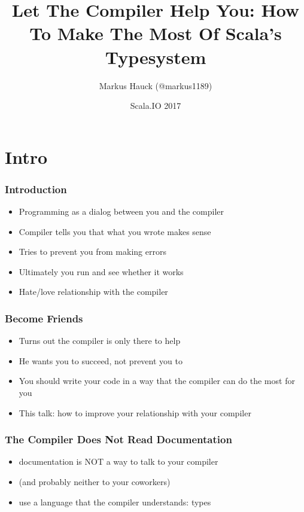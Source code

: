 \documentclass{beamer}
\title{Let The Compiler Help You: How To Make The Most Of Scala's Typesystem}
\author{Markus Hauck (@markus1189)}
\date{Scala.IO 2017}
\begin{document}
{
  \frame[plain]{\titlepage}
}

\section{Intro}
\label{sec:intro}

\begin{frame}
  \frametitle{Introduction}
  \begin{itemize}
  \item Programming as a dialog between you and the compiler
  \item Compiler tells you that what you wrote makes sense
  \item Tries to prevent you from making errors
  \item Ultimately you run and see whether it works
  \item Hate/love relationship with the compiler
  \end{itemize}
\end{frame}

\begin{frame}
  \frametitle{Become Friends}
  \begin{itemize}
  \item Turns out the compiler is only there to help
  \item He wants you to succeed, not prevent you to
  \item You should write your code in a way that the compiler can do
    the most for you
  \item This talk: how to improve your relationship with your compiler
  \end{itemize}
\end{frame}

\begin{frame}
  \frametitle{The Compiler Does Not Read Documentation}
  \begin{itemize}
  \item documentation is NOT a way to talk to your compiler
  \item (and probably neither to your coworkers)
  \item use a language that the compiler understands: types
  \end{itemize}
\end{frame}
\end{document}
